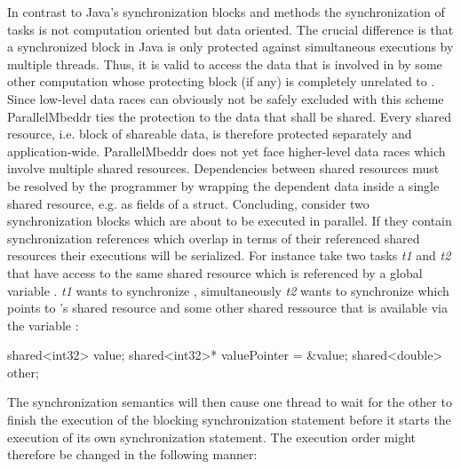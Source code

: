 In contrast to Java's synchronization blocks and methods \cite[p.~279]{JavaPerformanceTuning} the synchronization of tasks is not computation oriented but data oriented. The crucial difference is that a synchronized block  in Java is only protected against simultaneous executions by multiple threads. Thus, it is valid to access the data that is involved in  by some other computation whose protecting block (if any) is completely unrelated to . Since low-level data races can obviously not be safely excluded with this scheme ParallelMbeddr ties the protection to the data that shall be shared. Every shared resource, i.e. block of shareable data, is therefore protected separately and application-wide. ParallelMbeddr does not yet face higher-level data races which involve multiple shared resources. Dependencies between shared resources must be resolved by the programmer by wrapping the dependent data inside a single shared resource, e.g. as fields of a struct. Concluding, consider two synchronization blocks which are about to be executed in parallel. If they contain synchronization references which overlap in terms of their referenced shared resources their executions will be serialized. For instance take two tasks \textit{t1} and \textit{t2} that have access to the same shared resource which is referenced by a global variable . \textit{t1} wants to synchronize , simultaneously \textit{t2} wants to synchronize  which points to 's shared resource and some other shared ressource that is available via the variable :

\begin{ccode}
shared<int32> value;
shared<int32>* valuePointer = &value;
shared<double> other;
\end{ccode}
The synchronization semantics will then cause one thread to wait for the other to finish the execution of the blocking synchronization statement before it starts the execution of its own synchronization statement. The execution order might therefore be changed in the following manner:

